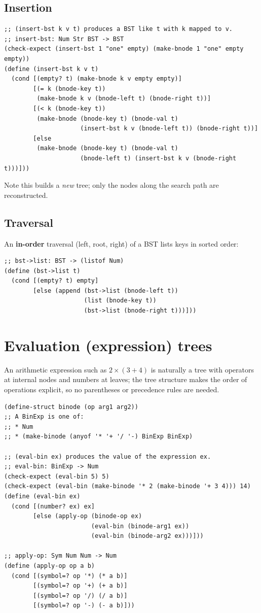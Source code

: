 \subsection{Insertion}
\begin{lstlisting}[style=racket]
;; (insert-bst k v t) produces a BST like t with k mapped to v.
;; insert-bst: Num Str BST -> BST
(check-expect (insert-bst 1 "one" empty) (make-bnode 1 "one" empty empty))
(define (insert-bst k v t)
  (cond [(empty? t) (make-bnode k v empty empty)]
        [(= k (bnode-key t))
         (make-bnode k v (bnode-left t) (bnode-right t))]
        [(< k (bnode-key t))
         (make-bnode (bnode-key t) (bnode-val t)
                     (insert-bst k v (bnode-left t)) (bnode-right t))]
        [else
         (make-bnode (bnode-key t) (bnode-val t)
                     (bnode-left t) (insert-bst k v (bnode-right t)))]))
\end{lstlisting}
Note this builds a \emph{new} tree; only the nodes along the search path are
reconstructed.

\subsection{Traversal}
An \textbf{in-order} traversal (left, root, right) of a BST lists keys in
sorted order:
\begin{lstlisting}[style=racket]
;; bst->list: BST -> (listof Num)
(define (bst->list t)
  (cond [(empty? t) empty]
        [else (append (bst->list (bnode-left t))
                      (list (bnode-key t))
                      (bst->list (bnode-right t)))]))
\end{lstlisting}

\section{Evaluation (expression) trees}
An arithmetic expression such as $2 \times (3 + 4)$ is naturally a tree with
operators at internal nodes and numbers at leaves; the tree structure makes
the order of operations explicit, so no parentheses or precedence rules are
needed.

\begin{lstlisting}[style=racket]
(define-struct binode (op arg1 arg2))
;; A BinExp is one of:
;; * Num
;; * (make-binode (anyof '* '+ '/ '-) BinExp BinExp)

;; (eval-bin ex) produces the value of the expression ex.
;; eval-bin: BinExp -> Num
(check-expect (eval-bin 5) 5)
(check-expect (eval-bin (make-binode '* 2 (make-binode '+ 3 4))) 14)
(define (eval-bin ex)
  (cond [(number? ex) ex]
        [else (apply-op (binode-op ex)
                        (eval-bin (binode-arg1 ex))
                        (eval-bin (binode-arg2 ex)))]))

;; apply-op: Sym Num Num -> Num
(define (apply-op op a b)
  (cond [(symbol=? op '*) (* a b)]
        [(symbol=? op '+) (+ a b)]
        [(symbol=? op '/) (/ a b)]
        [(symbol=? op '-) (- a b)]))
\end{lstlisting}


